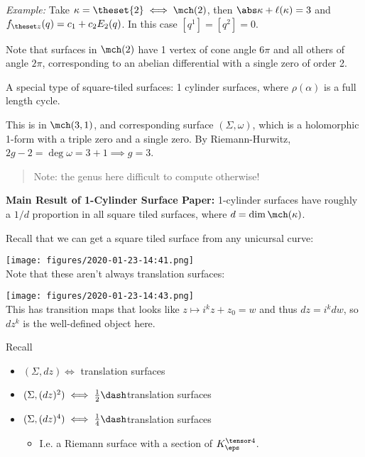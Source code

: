 \emph{Example:} Take \(\kappa = \theset{2} \iff \mch(2)\), then
\(\abs \kappa + \ell(\kappa) = 3\) and
\(f_{\theset z}(q) = c_1 + c_2 E_2(q)\). In this case
\([q^1] = [q^2] = 0\).

Note that surfaces in \(\mch(2)\) have 1 vertex of cone angle \(6\pi\)
and all others of angle \(2\pi\), corresponding to an abelian
differential with a single zero of order 2.

A special type of square-tiled surfaces: 1 cylinder surfaces, where
\(\rho(\alpha)\) is a full length cycle.

This is in \(\mch(3, 1)\), and corresponding surface
\((\Sigma, \omega)\), which is a holomorphic 1-form with a triple zero
and a single zero. By Riemann-Hurwitz,
\(2g-2 = \deg \omega = 3+1 \implies g = 3\).

\begin{quote}
Note: the genus here difficult to compute otherwise!
\end{quote}

\textbf{Main Result of 1-Cylinder Surface Paper:} 1-cylinder surfaces
have roughly a \(1/d\) proportion in all square tiled surfaces, where
\(d = \dim \mch(\kappa)\).

Recall that we can get a square tiled surface from any unicursal curve:

\texttt{[image: figures/2020-01-23-14:41.png]}\\

Note that these aren't always translation surfaces:

\texttt{[image: figures/2020-01-23-14:43.png]}\\

This has transition maps that looks like \(z \mapsto i^k z + z_0 = w\)
and thus \(dz = i^k dw\), so \(dz^k\) is the well-defined object here.

Recall

\begin{itemize}
\tightlist
\item
  \((\Sigma, dz) \iff\) translation surfaces
\item
  \((\Sigma, (dz)^2) \iff \frac 1 2 \dash\)translation surfaces
\item
  \((\Sigma, (dz)^4) \iff \frac 1 4\dash\)translation surfaces

  \begin{itemize}
  \tightlist
  \item
    I.e. a Riemann surface with a section of \(K_\eps^{\tensor 4}\).
  \end{itemize}
\end{itemize}

